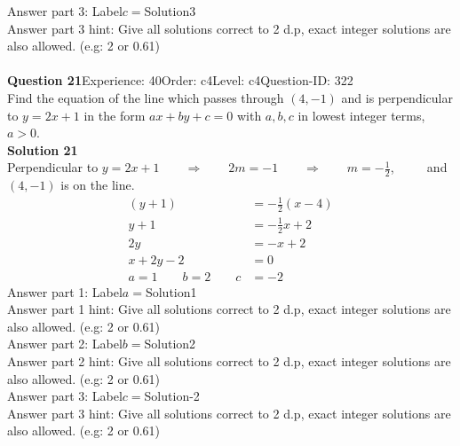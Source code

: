 \documentclass{article}
\begin{document}
Answer part 3: \hspace{10pt}Label\hspace{10pt}$c=$\hspace{10pt}Solution\hspace{10pt}3\\
Answer part 3 hint: \hspace{15pt}Give all solutions correct to 2 d.p, exact integer solutions are also allowed. (e.g: 2 or 0.61)\\
\\[4pt]
\noindent\textbf{Question 21}\hspace{20pt}Experience: 40\hspace{20pt}Order: c4\hspace{20pt}Level: c4\hspace{20pt}Question-ID: 322\\[2pt]
Find the equation of the line which passes through $(4,-1)$ and is perpendicular to $y=2x+1$ in the form $ax+by+c=0$ with $a,b,c$ in lowest integer terms, $a>0$.\\[4pt]
\noindent\textbf{Solution 21}\\[2pt]
Perpendicular to $y=2x+1 \qquad \Rightarrow \qquad 2m=-1
\qquad \Rightarrow \qquad  m=-\displaystyle\frac{1}{2}$, $\qquad$ and $(4,-1)$ is on the line.
\begin{align*}
(y+1)&=-\displaystyle\frac{1}{2}(x-4)\\[2pt]
y+1&=-\displaystyle\frac{1}{2}x+2\\[2pt]
2y&=-x+2\\[2pt]
x+2y-2&=0\\[2pt]
a=1\qquad b=2 \qquad c&=-2
\end{align*}
Answer part 1: \hspace{10pt}Label\hspace{10pt}$a=$\hspace{10pt}Solution\hspace{10pt}1\\
Answer part 1 hint: \hspace{15pt}Give all solutions correct to 2 d.p, exact integer solutions are also allowed. (e.g: 2 or 0.61)\\
Answer part 2: \hspace{10pt}Label\hspace{10pt}$b=$\hspace{10pt}Solution\hspace{10pt}2\\
Answer part 2 hint: \hspace{15pt}Give all solutions correct to 2 d.p, exact integer solutions are also allowed. (e.g: 2 or 0.61)\\
Answer part 3: \hspace{10pt}Label\hspace{10pt}$c=$\hspace{10pt}Solution\hspace{10pt}-2\\
Answer part 3 hint: \hspace{15pt}Give all solutions correct to 2 d.p, exact integer solutions are also allowed. (e.g: 2 or 0.61)\\
\\[4pt]
\end{document}
